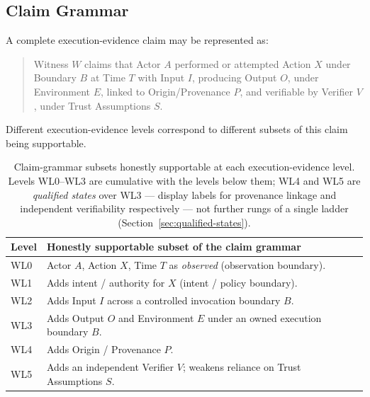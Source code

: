 \documentclass[11pt]{article}
\begin{document}
\subsection{Claim Grammar}
A complete execution-evidence claim may be represented as:

\begin{quote}
Witness $W$ claims that Actor $A$ performed or attempted Action $X$ under Boundary $B$ at Time $T$ with Input $I$, producing Output $O$, under Environment $E$, linked to Origin/Provenance $P$, and verifiable by Verifier $V$, under Trust Assumptions $S$.
\end{quote}

Different execution-evidence levels correspond to different subsets of this claim being supportable.

\begin{table}[h]
\centering
\small
\setlength{\tabcolsep}{4pt}
\begin{tabularx}{\textwidth}{@{}P{0.09\textwidth}Y@{}}
\toprule
Level & Honestly supportable subset of the claim grammar \\
\midrule
WL0 & Actor $A$, Action $X$, Time $T$ as \emph{observed} (observation boundary). \\
WL1 & Adds intent / authority for $X$ (intent / policy boundary). \\
WL2 & Adds Input $I$ across a controlled invocation boundary $B$. \\
WL3 & Adds Output $O$ and Environment $E$ under an owned execution boundary $B$. \\
WL4 & Adds Origin / Provenance $P$. \\
WL5 & Adds an independent Verifier $V$; weakens reliance on Trust Assumptions $S$. \\
\bottomrule
\end{tabularx}
\caption{Claim-grammar subsets honestly supportable at each execution-evidence level. Levels WL0--WL3 are cumulative with the levels below them; WL4 and WL5 are \emph{qualified states} over WL3 --- display labels for provenance linkage and independent verifiability respectively --- not further rungs of a single ladder (Section~\ref{sec:qualified-states}).}
\end{table}
\end{document}
